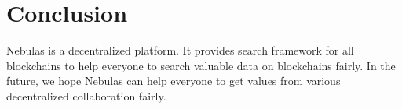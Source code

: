 \section{Conclusion}
\label{sec:conclusion}

Nebulas is a decentralized platform. It provides search framework for all blockchains to help everyone to search valuable data on blockchains fairly. In the future, we hope Nebulas can help everyone to get values from various decentralized collaboration fairly.